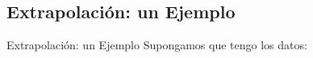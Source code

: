 \documentclass[xcolor=svgnames]{beamer} %
\theoremstyle{plain}
\theoremstyle{definition}
\begin{document}
\subsection{Extrapolación: un Ejemplo}
\begin{frame}{Extrapolación: un Ejemplo}
  Supongamos que tengo los datos:  
  \begin{center}
  \begin{minipage}{.7\linewidth}

\end{minipage}
\end{center}
\end{frame}
\end{document}
